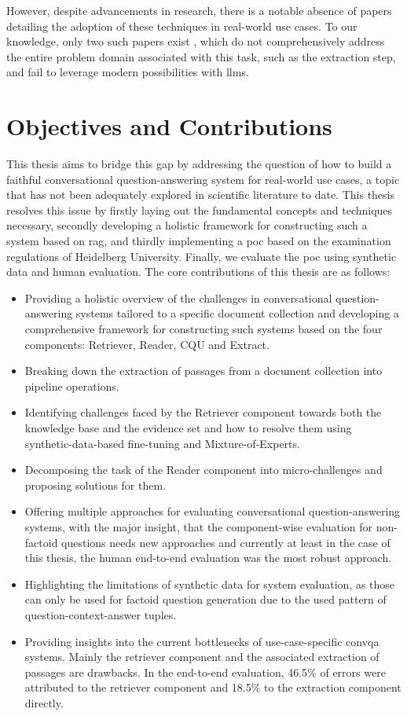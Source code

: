 However, despite advancements in research, there is a notable absence of papers detailing the adoption of these techniques in real-world use cases. To our knowledge, only two such papers exist \cite{feng_dialdoc_2021,gholami_zero-shot_2021}, which do not comprehensively address the entire problem domain associated with this task, such as the extraction step, and fail to leverage modern possibilities with \gls{llm}s.

\section{Objectives and Contributions}

This thesis aims to bridge this gap by addressing the question of how to build a faithful conversational question-answering system for real-world use cases, a topic that has not been adequately explored in scientific literature to date. This thesis resolves this issue by firstly laying out the fundamental concepts and techniques necessary, secondly developing a holistic framework for constructing such a system based on \gls{rag}, and thirdly implementing a \gls{poc} based on the examination regulations of Heidelberg University. Finally, we evaluate the \gls{poc} using synthetic data and human evaluation. The core contributions of this thesis are as follows:

\begin{itemize}
    \item Providing a holistic overview of the challenges in conversational question-answering systems tailored to a specific document collection and developing a comprehensive framework for constructing such systems based on the four components: Retriever, Reader, CQU and Extract.
    \item Breaking down the extraction of passages from a document collection into pipeline operations.
    \item Identifying challenges faced by the Retriever component towards both the knowledge base and the evidence set and how to resolve them using synthetic-data-based fine-tuning and Mixture-of-Experts.
    \item Decomposing the task of the Reader component into micro-challenges and proposing solutions for them.
    \item Offering multiple approaches for evaluating conversational question-answering systems, with the major insight, that the component-wise evaluation for non-factoid questions needs new approaches and currently at least in the case of this thesis, the human end-to-end evaluation was the most robust approach.
    \item Highlighting the limitations of synthetic data for system evaluation, as those can only be used for factoid question generation due to the used pattern of question-context-answer tuples.
    \item Providing insights into the current bottlenecks of use-case-specific \gls{convqa} systems. Mainly the retriever component and the associated extraction of passages are drawbacks. In the end-to-end evaluation, 46.5\% of errors were attributed to the retriever component and 18.5\% to the extraction component directly.
\end{itemize}

